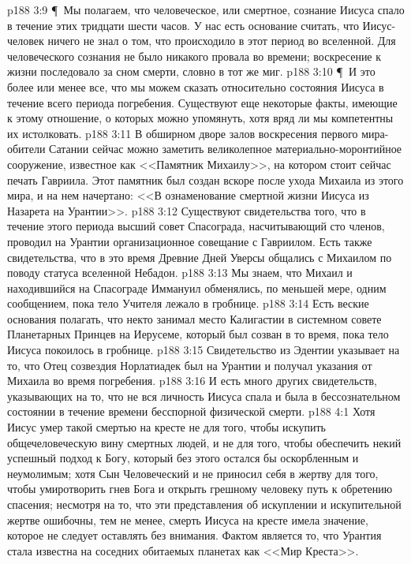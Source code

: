 \vs p188 3:9 \P\ \bibnobreakspace Мы полагаем, что человеческое, или смертное, сознание Иисуса спало в течение этих тридцати шести часов. У нас есть основание считать, что Иисус\hyp{}человек ничего не знал о том, что происходило в этот период во вселенной. Для человеческого сознания не было никакого провала во времени; воскресение к жизни последовало за сном смерти, словно в тот же миг.
\vs p188 3:10 \P\ И это более или менее все, что мы можем сказать относительно состояния Иисуса в течение всего периода погребения. Существуют еще некоторые факты, имеющие к этому отношение, о которых можно упомянуть, хотя вряд ли мы компетентны их истолковать.
\vs p188 3:11 В обширном дворе залов воскресения первого мира\hyp{}обители Сатании сейчас можно заметить великолепное материально\hyp{}моронтийное сооружение, известное как <<Памятник Михаилу>>, на котором стоит сейчас печать Гавриила. Этот памятник был создан вскоре после ухода Михаила из этого мира, и на нем начертано: <<В ознаменование смертной жизни Иисуса из Назарета на Урантии>>.
\vs p188 3:12 Существуют свидетельства того, что в течение этого периода высший совет Спасограда, насчитывающий сто членов, проводил на Урантии организационное совещание с Гавриилом. Есть также свидетельства, что в это время Древние Дней Уверсы общались с Михаилом по поводу статуса вселенной Небадон.
\vs p188 3:13 Мы знаем, что Михаил и находившийся на Спасограде Иммануил обменялись, по меньшей мере, одним сообщением, пока тело Учителя лежало в гробнице.
\vs p188 3:14 Есть веские основания полагать, что некто занимал место Калигастии в системном совете Планетарных Принцев на Иерусеме, который был созван в то время, пока тело Иисуса покоилось в гробнице.
\vs p188 3:15 Свидетельство из Эдентии указывает на то, что Отец созвездия Норлатиадек был на Урантии и получал указания от Михаила во время погребения.
\vs p188 3:16 И есть много других свидетельств, указывающих на то, что не вся личность Иисуса спала и была в бессознательном состоянии в течение времени бесспорной физической смерти.
\vs p188 4:1 Хотя Иисус умер такой смертью на кресте не для того, чтобы искупить общечеловеческую вину смертных людей, и не для того, чтобы обеспечить некий успешный подход к Богу, который без этого остался бы оскорбленным и неумолимым; хотя Сын Человеческий и не приносил себя в жертву для того, чтобы умиротворить гнев Бога и открыть грешному человеку путь к обретению спасения; несмотря на то, что эти представления об искуплении и искупительной жертве ошибочны, тем не менее, смерть Иисуса на кресте имела значение, которое не следует оставлять без внимания. Фактом является то, что Урантия стала известна на соседних обитаемых планетах как <<Мир Креста>>.
